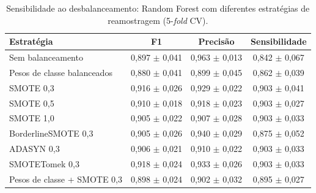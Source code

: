 \begin{table}[htbp]
\centering
\caption{Sensibilidade ao desbalanceamento: Random Forest com diferentes estrat\'egias de reamostragem (5-\textit{fold} CV).}
\label{tab:imbalance-sensitivity}
\begin{tabular}{lccc}
\toprule
Estrat\'egia & F1 & Precis\~ao & Sensibilidade \\
\midrule
Sem balanceamento & 0,897 $\pm$ 0,041 & 0,963 $\pm$ 0,013 & 0,842 $\pm$ 0,067 \\
Pesos de classe balanceados & 0,880 $\pm$ 0,041 & 0,899 $\pm$ 0,045 & 0,862 $\pm$ 0,039 \\
SMOTE 0,3 & 0,916 $\pm$ 0,026 & 0,929 $\pm$ 0,022 & 0,903 $\pm$ 0,041 \\
SMOTE 0,5 & 0,910 $\pm$ 0,018 & 0,918 $\pm$ 0,023 & 0,903 $\pm$ 0,027 \\
SMOTE 1,0 & 0,905 $\pm$ 0,022 & 0,907 $\pm$ 0,028 & 0,903 $\pm$ 0,033 \\
BorderlineSMOTE 0,3 & 0,905 $\pm$ 0,026 & 0,940 $\pm$ 0,029 & 0,875 $\pm$ 0,052 \\
ADASYN 0,3 & 0,906 $\pm$ 0,021 & 0,910 $\pm$ 0,022 & 0,903 $\pm$ 0,033 \\
SMOTETomek 0,3 & 0,918 $\pm$ 0,024 & 0,933 $\pm$ 0,026 & 0,903 $\pm$ 0,033 \\
Pesos de classe + SMOTE 0,3 & 0,898 $\pm$ 0,024 & 0,902 $\pm$ 0,032 & 0,895 $\pm$ 0,027 \\
\bottomrule
\end{tabular}
\end{table}